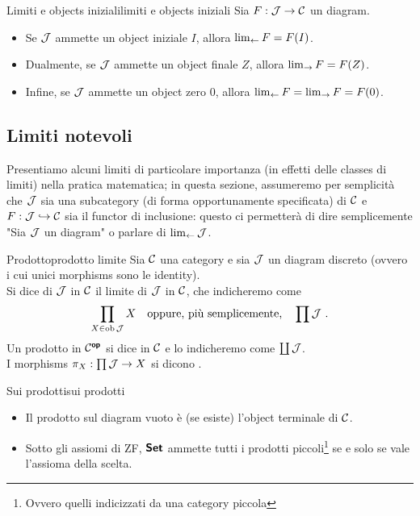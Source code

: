 \documentclass{article}
\renewcommand\C{\mc{C}}
\newcommand\J{\mc{J}}
\begin{document}
\begin{remark}{Limiti e objects iniziali}{limiti e objects iniziali}
    Sia $F:\J\to\C$ un diagram.\begin{itemize}
        \item Se $\J$ ammette un object iniziale $I$, allora $\lim_{\leftarrow} F = F(I)$.
        \item Dualmente, se $\J$ ammette un object finale $Z$, allora $\lim_{\rightarrow} F = F(Z)$.
        \item Infine, se $\J$ ammette un object zero $0$, allora $\lim_{\leftarrow} F = \lim_{\rightarrow} F = F(0)$.
    \end{itemize}
\end{remark}

\subsection{Limiti notevoli}

Presentiamo alcuni limiti di particolare importanza (in effetti delle classes di limiti) nella pratica matematica; in questa sezione, assumeremo per semplicità che $\J$ sia una subcategory (di forma opportunamente specificata) di $\C$ e $F : \J \inj \C$ sia il functor di inclusione: questo ci permetterà di dire semplicemente "Sia $\J$ un diagram" o parlare di $\catlim\J$.

\begin{definition}{Prodotto}{prodotto limite}
    Sia $\C$ una category e sia $\J$ un diagram discreto (ovvero i cui unici morphisms sono le identity).\\
    Si dice  di $\J$ in $\C$ il limite di $\J$ in $\C$, che indicheremo come
    \[ \prod_{X\in\ob\J} X\quad\text{oppure, più semplicemente,}\quad \prod\J\ . \]
    Un prodotto in $\C^\op$ si dice  in $\C$ e lo indicheremo come $\coprod \J$.\\
    I morphisms $\pi_X : \prod\J\to X$ si dicono .
\end{definition}

\begin{remark}{Sui prodotti}{sui prodotti}
    \begin{itemize}
        \item Il prodotto sul diagram vuoto è (se esiste) l'object terminale di $\C$.
        \item Sotto gli assiomi di ZF, $\text{\sffamily\textbf{Set}}$ ammette tutti i prodotti piccoli\footnote{Ovvero quelli indicizzati da una category piccola} se e solo se vale l'assioma della scelta.
    \end{itemize}
\end{remark}
\end{document}
